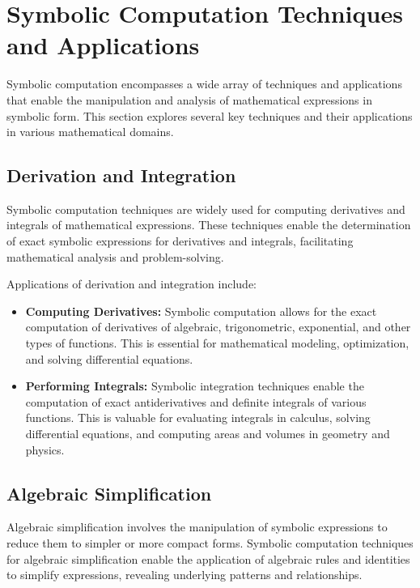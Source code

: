
\section{Symbolic Computation Techniques and Applications}
\label{chap2:sec:techniques}

Symbolic computation encompasses a wide array of techniques and applications that enable the manipulation and analysis of mathematical expressions in symbolic form. This section explores several key techniques and their applications in various mathematical domains.

\subsection{Derivation and Integration}

Symbolic computation techniques are widely used for computing derivatives and integrals of mathematical expressions. These techniques enable the determination of exact symbolic expressions for derivatives and integrals, facilitating mathematical analysis and problem-solving.

Applications of derivation and integration include:
%
\begin{itemize}
  \item \textbf{Computing Derivatives:} Symbolic computation allows for the exact computation of derivatives of algebraic, trigonometric, exponential, and other types of functions. This is essential for mathematical modeling, optimization, and solving differential equations.
  \item \textbf{Performing Integrals:} Symbolic integration techniques enable the computation of exact antiderivatives and definite integrals of various functions. This is valuable for evaluating integrals in calculus, solving differential equations, and computing areas and volumes in geometry and physics.
\end{itemize}

\subsection{Algebraic Simplification}

Algebraic simplification involves the manipulation of symbolic expressions to reduce them to simpler or more compact forms. Symbolic computation techniques for algebraic simplification enable the application of algebraic rules and identities to simplify expressions, revealing underlying patterns and relationships.

